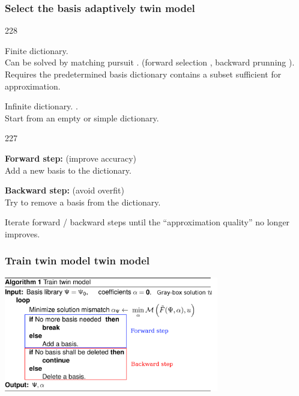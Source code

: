 \documentclass{beamer}
\let\oldcite=\cite
\renewcommand{\cite}[1]{\textcolor[rgb]{.4,.4,.85}{\oldcite{#1}}}
\newcommand{\barrow}{\item[\color{darkred}\ding{228}]}
\newcommand{\carrow}{\item[\color{darkred}\ding{227}]}
\begin{document}
\begin{frame}
    \frametitle{Select the basis adaptively \hfill \scriptsize{twin model}}\small
    \begin{dinglist}{228}
        \barrow Finite dictionary.  \\
                Can be solved by matching pursuit \scriptsize{\cite{Mallat 93}}\small.
                (forward selection \scriptsize{\cite{Friedman 94}} \small, 
                backward prunning \scriptsize \cite{Reed 93} \small).\\
                \vspace{.2cm}
                Requires the predetermined basis dictionary contains a subset sufficient
                for approximation.
        \vspace{.3cm}
        \barrow Infinite dictionary.
                 \scriptsize
                \cite{Jekabsons 10, Blatman 10} \small.\\
                \vspace{.2cm}
                Start from an empty or simple dictionary.
                \begin{dinglist}{227}
                    \carrow \textbf{Forward step:} (improve accuracy)\\
                    Add a new basis to the dictionary.
                    \carrow \textbf{Backward step:} (avoid overfit)\\
                    Try to remove a basis from the dictionary.
                \end{dinglist}
                Iterate forward / backward steps until the ``approximation quality'' no longer improves.
    \end{dinglist}
\end{frame}

\begin{frame}
    \frametitle{Train twin model \hfill \scriptsize{twin model}}\small
    \begin{center}
        \includegraphics[height=5cm]{algo1.png}
    \end{center}
\end{frame}
\end{document}
